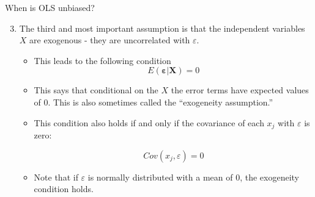\documentclass{beamer}
\begin{document}
\setcounter{equation}{4}
\begin{frame}{When is OLS unbiased?}
    \begin{enumerate}
        \setcounter{enumi}{2}
        \item The third and most important assumption is that the independent variables $X$ are exogenous - they are uncorrelated with $\varepsilon$.

            \begin{itemize}
            \item This leads to the following condition
                \begin{equation}
                E(\boldsymbol{\varepsilon}|\mathbf{X} ) = 0
                \end{equation}  \label{exogeneity}

            \item This says that conditional on the $X$ the error terms have expected values of 0. This is also sometimes called the ``exogeneity assumption.''

            \item This condition also holds if and only if  the covariance of each $x_j$ with $\varepsilon$ is zero:

                 \begin{equation}
                 Cov(x_j, \varepsilon) = 0
                \end{equation}

            \item Note that if $\varepsilon$ is normally distributed with a mean of 0, the exogeneity condition holds.
		
            \end{itemize}
  \end{enumerate}
\end{frame}
\end{document}

